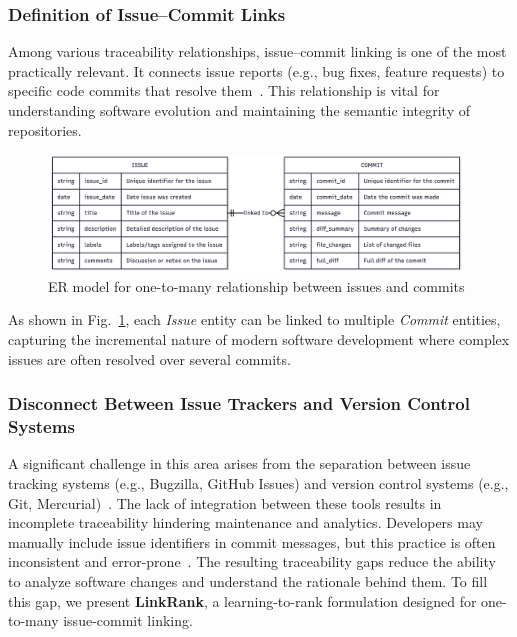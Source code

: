 \subsubsection*{Definition of Issue–Commit Links}

Among various traceability relationships, issue–commit linking is one of the most practically relevant. It connects issue reports (e.g., bug fixes, feature requests) to specific code commits that resolve them~\cite{r11,r12}. This relationship is vital for understanding software evolution and maintaining the semantic integrity of repositories.

\begin{figure}[H]
    \centering
    \includegraphics[width=0.98\textwidth]{Figures/er-issue-commit.png}
    \caption{ER model for one-to-many relationship between issues and commits}
    \label{fig:er_issue_commit}
\end{figure}


As shown in Fig.~\ref{fig:er_issue_commit}, each \textit{Issue} entity can be linked to multiple \textit{Commit} entities, capturing the incremental nature of modern software development where complex issues are often resolved over several commits.


\subsubsection*{Disconnect Between Issue Trackers and Version Control Systems}

A significant challenge in this area arises from the separation between issue tracking systems (e.g., Bugzilla, GitHub Issues) and version control systems (e.g., Git, Mercurial)~\cite{r1,r2}. The lack of integration between these tools results in incomplete traceability hindering maintenance and analytics. Developers may manually include issue identifiers in commit messages, but this practice is often inconsistent and error-prone~\cite{r16,r18}. The resulting traceability gaps reduce the ability to analyze software changes and understand the rationale behind them. To fill this gap, we present \textbf{LinkRank}, a learning-to-rank formulation designed for one-to-many issue-commit linking.

